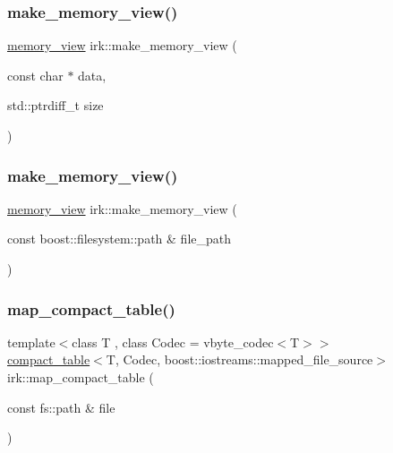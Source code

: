 \mbox{\label{namespaceirk_a18d9d6db7e3598a806378b697fabb802}} 
\subsubsection{\texorpdfstring{make\+\_\+memory\+\_\+view()}{make\_memory\_view()}\hspace{0.1cm}{\footnotesize\ttfamily [3/4]}}
{\footnotesize\ttfamily \mbox{\hyperlink{classirk_1_1memory__view}{memory\+\_\+view}} irk\+::make\+\_\+memory\+\_\+view (\begin{DoxyParamCaption}\item[{const char $\ast$}]{data,  }\item[{std\+::ptrdiff\+\_\+t}]{size }\end{DoxyParamCaption})\hspace{0.3cm}{\ttfamily [inline]}}

\mbox{\label{namespaceirk_af0a614c4c802be8ef7136278c00c1377}} 
\subsubsection{\texorpdfstring{make\+\_\+memory\+\_\+view()}{make\_memory\_view()}\hspace{0.1cm}{\footnotesize\ttfamily [4/4]}}
{\footnotesize\ttfamily \mbox{\hyperlink{classirk_1_1memory__view}{memory\+\_\+view}} irk\+::make\+\_\+memory\+\_\+view (\begin{DoxyParamCaption}\item[{const boost\+::filesystem\+::path \&}]{file\+\_\+path }\end{DoxyParamCaption})\hspace{0.3cm}{\ttfamily [inline]}}

\mbox{\label{namespaceirk_a2404dd8fd003ee848e563f3538972979}} 
\subsubsection{\texorpdfstring{map\+\_\+compact\+\_\+table()}{map\_compact\_table()}}
{\footnotesize\ttfamily template$<$class T , class Codec  = vbyte\+\_\+codec$<$\+T$>$$>$ \\
\mbox{\hyperlink{classirk_1_1compact__table}{compact\+\_\+table}}$<$T, Codec, boost\+::iostreams\+::mapped\+\_\+file\+\_\+source$>$ irk\+::map\+\_\+compact\+\_\+table (\begin{DoxyParamCaption}\item[{const fs\+::path \&}]{file }\end{DoxyParamCaption})}



